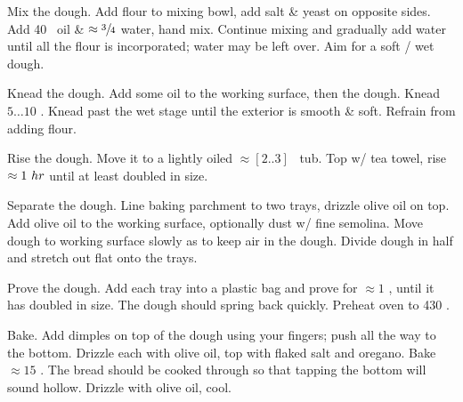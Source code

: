 \begin{preparation}
\item Mix the dough.
	Add flour to mixing bowl, add salt \& yeast on opposite sides.
	Add 40 \milliliter~oil \& $\approx\threefourth$ water, hand mix.
	Continue mixing and gradually add water until all the flour is incorporated; water may be left over.
	Aim for a soft / wet dough.

\item Knead the dough.
	Add some oil to the working surface, then the dough.
	Knead $5 \dots 10$ \minute.
	Knead past the wet stage until the exterior is smooth \& soft.
	Refrain from adding flour.

\item Rise the dough.
    Move it to a lightly oiled $\approx [2 .. 3]$ \quart~tub.
	Top w/ tea towel, rise $\approx 1~\hour$ until at least doubled in size.

\item Separate the dough.
	Line baking parchment to two trays, drizzle olive oil on top.
	Add olive oil to the working surface, optionally dust w/ fine semolina.
	Move dough to working surface slowly as to keep air in the dough.
	Divide dough in half and stretch out flat onto the trays.

\item Prove the dough.
	Add each tray into a plastic bag and prove for $\approx 1$ \hour, until it has doubled in size.
	The dough should spring back quickly.
	Preheat oven to 430 \Fahrenheit.

\item Bake.
	Add dimples on top of the dough using your fingers; push all the way to the bottom.
	Drizzle each with olive oil, top with flaked salt and oregano.
	Bake $\approx 15$ \minute.
	The bread should be cooked through so that tapping the bottom will sound hollow.
	Drizzle with olive oil, cool.
\end{preparation}


\recipeend%

